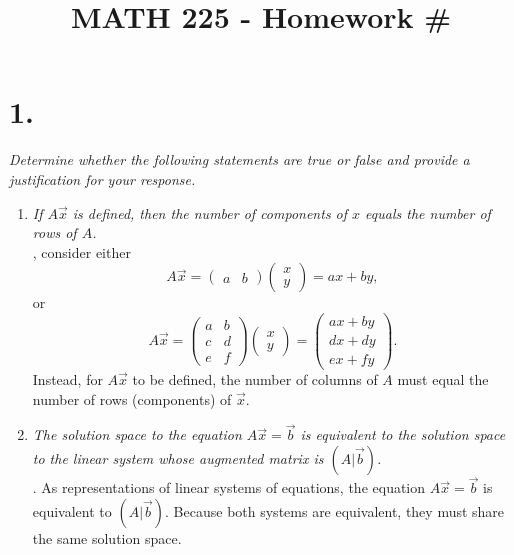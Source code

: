 \documentclass[12pt]{article}
\title{\vspace{-2\baselineskip}MATH 225 - Homework \#\HOMEWORKNUM}
\author{\NAME}
\date{\DATE}
\begin{document}
\maketitle

\section*{1.}
\textit{Determine whether the following statements are true or false and
provide a justification for your response.}
\begin{enumerate}[label=(\alph*)]
	\item \textit{If $A\vec{x}$ is defined, then the number of components of
	$x$ equals the number of rows of $A$.} \\[\baselineskip]
	, consider either
	\begin{equation*}
		A\vec{x} =
		\begin{pmatrix} a & b \end{pmatrix}
		\begin{pmatrix} x \\ y \end{pmatrix}
		= ax + by
		,
	\end{equation*}
	or
	\begin{equation*}
		A\vec{x} =
		\begin{pmatrix} a & b \\ c & d \\ e & f \end{pmatrix}
		\begin{pmatrix} x \\ y \end{pmatrix}
		=
		\begin{pmatrix}
			ax + by \\
			dx + dy \\
			ex + fy
		\end{pmatrix}
		.
	\end{equation*}
	Instead, for $A\vec{x}$ to be defined, the number of columns of $A$ must
	equal the number of rows (components) of $\vec{x}$.
	
	\item \textit{The solution space to the equation $A\vec{x} = \vec{b}$ is
	equivalent to the solution space to the linear system whose augmented
	matrix is $(A|\vec{b})$.} \\[\baselineskip]
	. As representations of linear systems of equations,
	the equation $A\vec{x} = \vec{b}$ is equivalent to $(A|\vec{b})$. Because
	both systems are equivalent, they must share the same solution space.
	

\end{enumerate}
\end{document}
